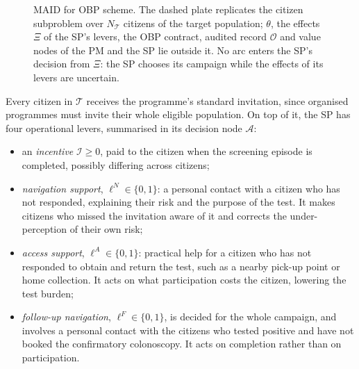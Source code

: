 \documentclass[12pt]{article}
\begin{document}
\begin{figure}[h!]
{}
    \caption{MAID for OBP scheme. The dashed plate replicates the citizen subproblem over $N_{\mathcal{T}}$ citizens of the target population; $\theta$, the effects $\Xi$ of the SP's levers, the OBP contract, audited record $\mathcal{O}$ and value nodes of the PM and the SP lie outside it. No arc enters the SP's decision from $\Xi$: the SP chooses its campaign while the effects of its levers are uncertain.}
    \label{fig:multiagent_obp}
\end{figure}
Every citizen in $\mathcal{T}$ receives the programme's standard invitation, since organised programmes must invite their whole eligible population. On top of it, the SP has four operational levers, summarised in its decision node $\mathcal{A}$:
\begin{itemize}
    \item an \emph{incentive} $\mathcal{I} \geq 0$, paid to the citizen when the screening episode is completed, possibly differing across citizens;
  \item \emph{navigation support}, $\ell^{N} \in \{0,1\}$: a personal contact with a citizen who has not responded, explaining their risk and the purpose of the test. It makes citizens who missed the invitation aware of it and corrects the under-perception of their own risk;
  \item \emph{access support}, $\ell^{A} \in \{0,1\}$: practical help for a citizen who has not responded to obtain and return the test, such as a nearby pick-up point or home collection. It acts on what participation costs the citizen, lowering the test burden;
  \item \emph{follow-up navigation}, $\ell^{F} \in \{0,1\}$, is decided for the whole campaign, and involves a personal contact with the citizens who tested positive and have not booked the confirmatory colonoscopy. It acts on completion rather than on participation.
\end{itemize}
\end{document}
